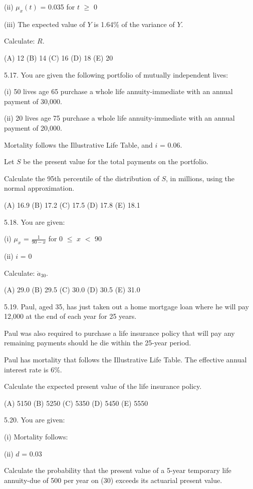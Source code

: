 \documentclass[]{book}
\begin{document}
(ii) \(\mu_x(t)\) = 0.035 for \(t\) \(\ge\) 0

(iii) The expected value of \(Y\) is 1.64\% of the variance of \(Y\).

Calculate: \(R\).

(A) 12 (B) 14 (C) 16 (D) 18 (E) 20

5.17. You are given the following portfolio of mutually independent
lives:

(i) 50 lives age 65 purchase a whole life annuity-immediate with an
annual payment of 30,000.

(ii) 20 lives age 75 purchase a whole life annuity-immediate with an
annual payment of 20,000.

Mortality follows the Illustrative Life Table, and \(i\) = 0.06.

Let \(S\) be the present value for the total payments on the portfolio.

Calculate the 95th percentile of the distribution of \(S\), in millions,
using the normal approximation.

(A) 16.9 (B) 17.2 (C) 17.5 (D) 17.8 (E) 18.1

5.18. You are given:

(i) \(\mu_x\) = \(\frac{1}{90 - x}\) for 0 \(\le\) \(x\) \(<\) 90

(ii) \(i\) = 0

Calculate: \(\ddot{a}_{30}\).

(A) 29.0 (B) 29.5 (C) 30.0 (D) 30.5 (E) 31.0

5.19. Paul, aged 35, has just taken out a home mortgage loan where he
will pay 12,000 at the end of each year for 25 years.

Paul was also required to purchase a life insurance policy that will pay
any remaining payments should he die within the 25-year period.

Paul has mortality that follows the Illustrative Life Table. The
effective annual interest rate is 6\%.

Calculate the expected present value of the life insurance policy.

(A) 5150 (B) 5250 (C) 5350 (D) 5450 (E) 5550

5.20. You are given:

(i) Mortality follows:

(ii) \(d\) = 0.03

Calculate the probability that the present value of a 5-year temporary
life annuity-due of 500 per year on (30) exceeds its actuarial present
value.
\end{document}
